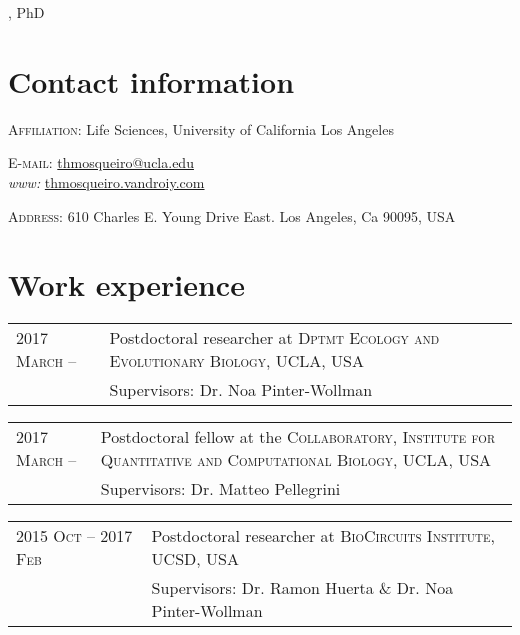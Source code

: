 \documentclass[letter,10pt]{article} %
\begin{document}
\par{\bigskip, PhD\par}

\vspace{-0.5cm}
{\bigskip\par}

\vspace{-0.5cm}
\section{Contact information}

\textsc{Affiliation:} Life Sciences, University of California Los Angeles

\begin{minipage}{0.4\textwidth}
  \textsc{E-mail:} \href{mailto:thmosqueiro@ucla.edu}{thmosqueiro@ucla.edu} \\
  \textit{www:} \href{http://thmosqueiro.vandroiy.com}{thmosqueiro.vandroiy.com}
\end{minipage}
\begin{minipage}{0.5\textwidth}
  \textsc{Address:} 610 Charles E. Young Drive East. Los Angeles, Ca 90095, USA \\
\end{minipage}


\vspace{0.5cm}
\section{Work experience}

\begin{tabular}{p{3.2cm}|p{13cm}}
  \textsc{2017 March -- } & Postdoctoral researcher at \textsc{Dptmt Ecology and Evolutionary Biology}, UCLA, USA \emph{}\\
  & \footnotesize{Supervisors: Dr. Noa Pinter-Wollman}
\end{tabular}

\begin{tabular}{p{3.2cm}|p{11cm}}
  \textsc{2017 March -- } & Postdoctoral fellow at the \textsc{Collaboratory, Institute for Quantitative and Computational Biology}, UCLA, USA \emph{}\\
  & \footnotesize{Supervisors: Dr. Matteo Pellegrini}
\end{tabular}

\begin{tabular}{p{3.2cm}|p{11cm}}
  \textsc{2015 Oct -- 2017 Feb} & Postdoctoral researcher at \textsc{BioCircuits Institute}, UCSD, USA \emph{}\\
  & \footnotesize{Supervisors: Dr. Ramon Huerta \& Dr. Noa Pinter-Wollman}
\end{tabular}
\end{document}
